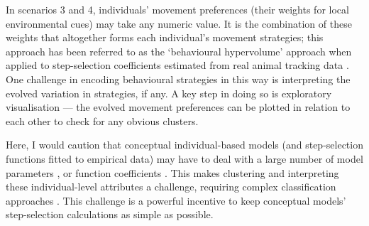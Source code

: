 \begin{interludeenv}
In scenarios 3 and 4, individuals' movement preferences (their weights for local environmental cues) may take any numeric value.
It is the combination of these weights that altogether forms each individual's movement strategies; this approach has been referred to as the `behavioural hypervolume' approach when applied to step-selection coefficients estimated from real animal tracking data \parencite{bastille-rousseau2019}.
One challenge in encoding behavioural strategies in this way is interpreting the evolved variation in strategies, if any.
A key step in doing so is exploratory visualisation --- the evolved movement preferences can be plotted in relation to each other to check for any obvious clusters.

Here, I would caution that conceptual individual-based models (and step-selection functions fitted to empirical data) may have to deal with a large number of model parameters \parencite{mueller2011}, or function coefficients \parencite{bastille-rousseau2019}.
This makes clustering and interpreting these individual-level attributes a challenge, requiring complex classification approaches \parencite{bastille-rousseau2019}.
This challenge is a powerful incentive to keep conceptual models' step-selection calculations as simple as possible.


\end{interludeenv}
